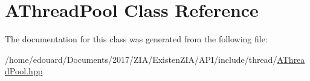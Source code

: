 \hypertarget{classAThreadPool}{}\section{A\+Thread\+Pool Class Reference}
\label{classAThreadPool}


The documentation for this class was generated from the following file\+:\begin{DoxyCompactItemize}
\item 
/home/edouard/\+Documents/2017/\+Z\+I\+A/\+Existen\+Z\+I\+A/\+A\+P\+I/include/thread/\mbox{\hyperlink{AThreadPool_8hpp}{A\+Thread\+Pool.\+hpp}}\end{DoxyCompactItemize}
